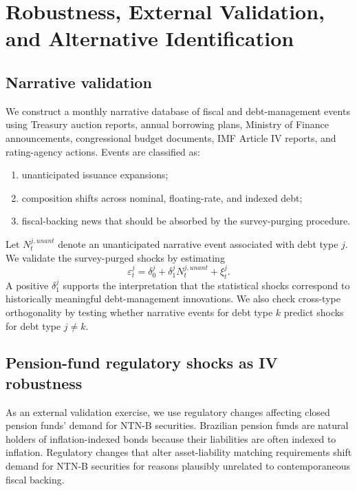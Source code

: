 \documentclass[12pt,a4paper]{article}
\begin{document}
\section{Robustness, External Validation, and Alternative Identification}
\label{sec:robustness}

\subsection{Narrative validation}

We construct a monthly narrative database of fiscal and debt-management events using Treasury auction reports, annual borrowing plans, Ministry of Finance announcements, congressional budget documents, IMF Article IV reports, and rating-agency actions. Events are classified as:
\begin{enumerate}[leftmargin=1.2cm]
    \item unanticipated issuance expansions;
    \item composition shifts across nominal, floating-rate, and indexed debt;
    \item fiscal-backing news that should be absorbed by the survey-purging procedure.
\end{enumerate}

Let \(N_t^{j,unant}\) denote an unanticipated narrative event associated with debt type \(j\). We validate the survey-purged shocks by estimating
\begin{equation}
\varepsilon_t^j
=
\delta_0^j
+
\delta_1^j N_t^{j,unant}
+
\xi_t^j.
\end{equation}
A positive \(\delta_1^j\) supports the interpretation that the statistical shocks correspond to historically meaningful debt-management innovations. We also check cross-type orthogonality by testing whether narrative events for debt type \(k\) predict shocks for debt type \(j\neq k\).

\subsection{Pension-fund regulatory shocks as IV robustness}

As an external validation exercise, we use regulatory changes affecting closed pension funds' demand for NTN-B securities. Brazilian pension funds are natural holders of inflation-indexed bonds because their liabilities are often indexed to inflation. Regulatory changes that alter asset-liability matching requirements shift demand for NTN-B securities for reasons plausibly unrelated to contemporaneous fiscal backing.
\end{document}
